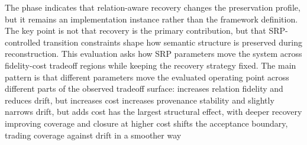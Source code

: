 \markdownRendererInterblockSeparator
{}\markdownRendererInterblockSeparator
{}\markdownRendererInterblockSeparator
{}\markdownRendererInterblockSeparator
{}\markdownRendererInterblockSeparator
{}
\markdownRendererSectionEnd \markdownRendererSectionBegin
{}\markdownRendererInterblockSeparator
{}The phase indicates that relation-aware recovery changes the preservation profile, but it remains an implementation instance rather than the framework definition. The key point is not that recovery is the primary contribution, but that SRP-controlled transition constraints shape how semantic structure is preserved during reconstruction.\markdownRendererInterblockSeparator
{}
\markdownRendererSectionEnd 
\markdownRendererSectionEnd \markdownRendererSectionBegin
{}\markdownRendererInterblockSeparator
{}This evaluation asks how SRP parameters move the system across fidelity-cost tradeoff regions while keeping the recovery strategy fixed.\markdownRendererParagraphSeparator
{}The main pattern is that different parameters move the evaluated operating point across different parts of the observed tradeoff surface:\markdownRendererInterblockSeparator
{}\markdownRendererUlBeginTight
\markdownRendererUlItem {} increases relation fidelity and reduces drift, but increases cost\markdownRendererUlItemEnd 
\markdownRendererUlItem {} increases provenance stability and slightly narrows drift, but adds cost\markdownRendererUlItemEnd 
\markdownRendererUlItem {} has the largest structural effect, with deeper recovery improving coverage and closure at higher cost\markdownRendererUlItemEnd 
\markdownRendererUlItem {} shifts the acceptance boundary, trading coverage against drift in a smoother way\markdownRendererUlItemEnd 
\markdownRendererUlEndTight \markdownRendererInterblockSeparator
